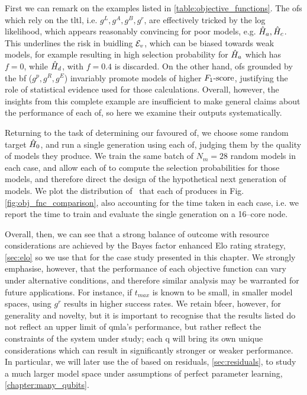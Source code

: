 First we can remark on the examples listed in \cref{table:objective_functions}. 
The \glspl{of} which rely on the \gls{tltl}, i.e. $g^L, g^A, g^B, g^r$, 
    are effectively tricked by the log likelihood, which appears reasonably convincing for 
    poor models, e.g. $\hat{H}_a, \hat{H}_c$. 
This underlines the risk in buidling ${ \mathcal{E} }_v$, which can be biased towards weak models, 
    for example resulting in high selection probability for $\hat{H}_a$ which has $f=0$, 
    while $\hat{H}_d$, with $f=0.4$ is discarded. 
On the other hand, \glspl{of} grounded by the \gls{bf} ($g^p, g^R, g^E$) invariably 
    promote models of higher $ F_{1}\text{-score} $, justifying the role of statistical evidence 
    used for those calculations. 
Overall, however, the insights from this complete example are insufficient to 
    make general claims about the performance of each \gls{of}, 
    so here we examine their outputs systematically. 
\par 

Returning to the task of determining our favoured \gls{of}, 
    we choose some random target $\hat{H}_0$, 
    and run a single generation using each \gls{of}, 
    judging them by the quality of models they produce.
We train the same batch of $N_m=28$ random models in each case, and allow each \gls{of} 
    to compute the selection probabilities for those models, 
    and therefore direct the design of the hypothetical next generation of models. 
We plot the distribution of \fs \ that each \gls{of} produces in Fig. \ref{fig:obj_fnc_comparison},
    also accounting for the time taken in each case, i.e. 
    we report the time to train and evaluate the single generation on a 16--core node.
\par

Overall, then, we can see that a strong balance of outcome with resource considerations 
    are achieved by the Bayes factor enhanced Elo rating strategy, \cref{sec:elo}
    so we use that for the case study presented in this chapter. 
We strongly emphasise, however, that the performance of each objective function
    can vary under alternative conditions, and therefore similar analysis may 
    be warranted for future applications. 
For instance, if $t_{max}$ is known to be small, 
    in smaller model spaces, using $g^r$ results in higher success rates.
We retain \gls{bfeer}, however, for generality and novelty, 
    but it is important to recognise that the results listed do not reflect
    an upper limit of \gls{qmla}'s performance, 
    but rather reflect the constraints of the system under study; 
    each \gls{q} will bring its own unique considerations which can result in 
    significantly stronger or weaker performance. 
In particular, we will later use the \gls{of} based on residuals, \cref{sec:residuals}, 
    to study a much larger \gls{model space} under assumptions of perfect parameter learning, \cref{chapter:many_qubits}.



